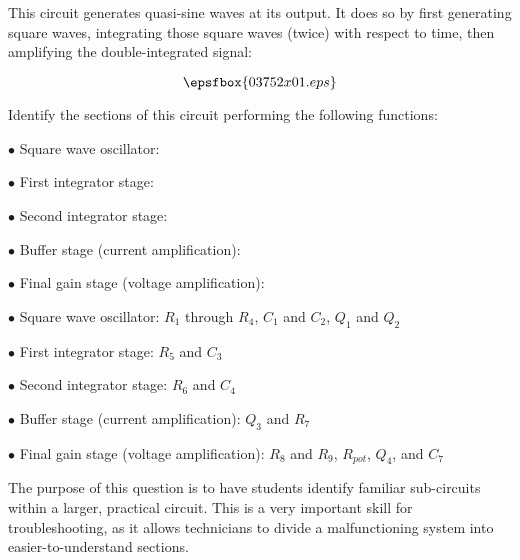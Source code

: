 

This circuit generates quasi-sine waves at its output.  It does so by first generating square waves, integrating those square waves (twice) with respect to time, then amplifying the double-integrated signal:

$$\epsfbox{03752x01.eps}$$

Identify the sections of this circuit performing the following functions:

\medskip
\item{$\bullet$} Square wave oscillator:
\item{$\bullet$} First integrator stage:
\item{$\bullet$} Second integrator stage:
\item{$\bullet$} Buffer stage (current amplification):
\item{$\bullet$} Final gain stage (voltage amplification):
\medskip







\medskip
\item{$\bullet$} Square wave oscillator: $R_1$ through $R_4$, $C_1$ and $C_2$, $Q_1$ and $Q_2$
\item{$\bullet$} First integrator stage: $R_5$ and $C_3$
\item{$\bullet$} Second integrator stage: $R_6$ and $C_4$
\item{$\bullet$} Buffer stage (current amplification): $Q_3$ and $R_7$
\item{$\bullet$} Final gain stage (voltage amplification): $R_8$ and $R_9$, $R_{pot}$, $Q_4$, and $C_7$
\medskip







The purpose of this question is to have students identify familiar sub-circuits within a larger, practical circuit.  This is a very important skill for troubleshooting, as it allows technicians to divide a malfunctioning system into easier-to-understand sections.




